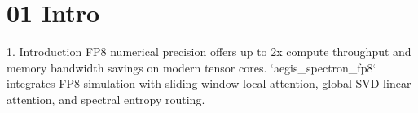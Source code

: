 \section{01 Intro}

 1. Introduction
FP8 numerical precision offers up to 2x compute throughput and memory bandwidth savings on modern tensor cores. `aegis\_spectron\_fp8` integrates FP8 simulation with sliding-window local attention, global SVD linear attention, and spectral entropy routing.
